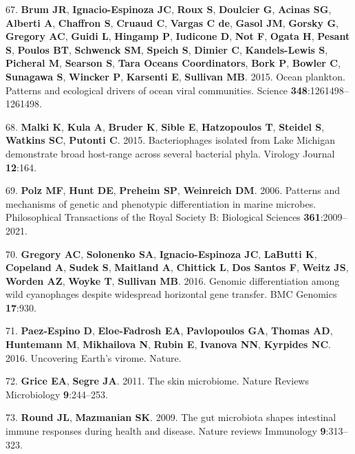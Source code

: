 \documentclass[12pt,]{article}
\begin{document}
\hypertarget{ref-Brum:2015iaa}{}
67. \textbf{Brum JR}, \textbf{Ignacio-Espinoza JC}, \textbf{Roux S},
\textbf{Doulcier G}, \textbf{Acinas SG}, \textbf{Alberti A},
\textbf{Chaffron S}, \textbf{Cruaud C}, \textbf{Vargas C de},
\textbf{Gasol JM}, \textbf{Gorsky G}, \textbf{Gregory AC}, \textbf{Guidi
L}, \textbf{Hingamp P}, \textbf{Iudicone D}, \textbf{Not F},
\textbf{Ogata H}, \textbf{Pesant S}, \textbf{Poulos BT},
\textbf{Schwenck SM}, \textbf{Speich S}, \textbf{Dimier C},
\textbf{Kandels-Lewis S}, \textbf{Picheral M}, \textbf{Searson S},
\textbf{Tara Oceans Coordinators}, \textbf{Bork P}, \textbf{Bowler C},
\textbf{Sunagawa S}, \textbf{Wincker P}, \textbf{Karsenti E},
\textbf{Sullivan MB}. 2015. Ocean plankton. Patterns and ecological
drivers of ocean viral communities. Science
\textbf{348}:1261498--1261498.

\hypertarget{ref-Malki:2015dw}{}
68. \textbf{Malki K}, \textbf{Kula A}, \textbf{Bruder K}, \textbf{Sible
E}, \textbf{Hatzopoulos T}, \textbf{Steidel S}, \textbf{Watkins SC},
\textbf{Putonti C}. 2015. Bacteriophages isolated from Lake Michigan
demonstrate broad host-range across several bacterial phyla. Virology
Journal \textbf{12}:164.

\hypertarget{ref-Polz:2006fi}{}
69. \textbf{Polz MF}, \textbf{Hunt DE}, \textbf{Preheim SP},
\textbf{Weinreich DM}. 2006. Patterns and mechanisms of genetic and
phenotypic differentiation in marine microbes. Philosophical
Transactions of the Royal Society B: Biological Sciences
\textbf{361}:2009--2021.

\hypertarget{ref-Gregory:2016cg}{}
70. \textbf{Gregory AC}, \textbf{Solonenko SA}, \textbf{Ignacio-Espinoza
JC}, \textbf{LaButti K}, \textbf{Copeland A}, \textbf{Sudek S},
\textbf{Maitland A}, \textbf{Chittick L}, \textbf{Dos Santos F},
\textbf{Weitz JS}, \textbf{Worden AZ}, \textbf{Woyke T},
\textbf{Sullivan MB}. 2016. Genomic differentiation among wild
cyanophages despite widespread horizontal gene transfer. BMC Genomics
\textbf{17}:930.

\hypertarget{ref-PaezEspino:2016gi}{}
71. \textbf{Paez-Espino D}, \textbf{Eloe-Fadrosh EA},
\textbf{Pavlopoulos GA}, \textbf{Thomas AD}, \textbf{Huntemann M},
\textbf{Mikhailova N}, \textbf{Rubin E}, \textbf{Ivanova NN},
\textbf{Kyrpides NC}. 2016. Uncovering Earth's virome. Nature.

\hypertarget{ref-Grice:2011gy}{}
72. \textbf{Grice EA}, \textbf{Segre JA}. 2011. The skin microbiome.
Nature Reviews Microbiology \textbf{9}:244--253.

\hypertarget{ref-Round:2009bz}{}
73. \textbf{Round JL}, \textbf{Mazmanian SK}. 2009. The gut microbiota
shapes intestinal immune responses during health and disease. Nature
reviews Immunology \textbf{9}:313--323.
\end{document}
